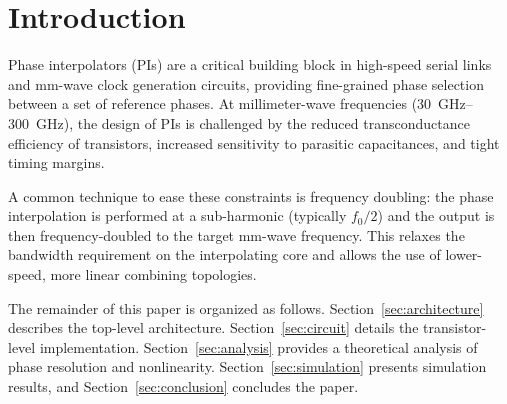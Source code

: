 \section{Introduction}
\label{sec:introduction}

Phase interpolators (PIs) are a critical building block in high-speed serial
links and mm-wave clock generation circuits, providing fine-grained phase
selection between a set of reference phases. At millimeter-wave frequencies
(\SIrange{30}{300}{\giga\hertz}), the design of PIs is challenged by the
reduced transconductance efficiency of transistors, increased sensitivity to
parasitic capacitances, and tight timing margins.

A common technique to ease these constraints is frequency doubling: the
phase interpolation is performed at a sub-harmonic (typically \(f_0/2\)) and
the output is then frequency-doubled to the target mm-wave frequency. This
relaxes the bandwidth requirement on the interpolating core and allows the
use of lower-speed, more linear combining topologies.

The remainder of this paper is organized as follows.
Section~\ref{sec:architecture} describes the top-level architecture.
Section~\ref{sec:circuit} details the transistor-level implementation.
Section~\ref{sec:analysis} provides a theoretical analysis of phase
resolution and nonlinearity. Section~\ref{sec:simulation} presents simulation
results, and Section~\ref{sec:conclusion} concludes the paper.
